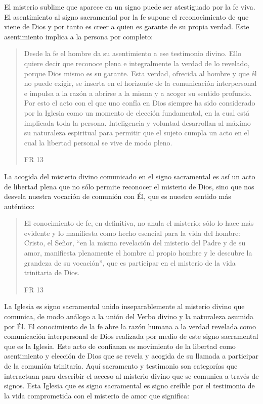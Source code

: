 El misterio sublime que aparece en un signo puede ser atestiguado por la fe
viva. El asentimiento al signo sacramental por la fe supone el reconocimiento de
que viene de Dios y por tanto es creer a quien es garante de su propia verdad.
Este asentimiento implica a la persona por completo:
\blockquote[FR 13]{Desde la fe el hombre da su asentimiento a ese testimonio
  divino. Ello quiere decir que reconoce plena e integralmente la verdad de lo
  revelado, porque Dios mismo es su garante. Esta verdad, ofrecida al hombre y
  que él no puede exigir, se inserta en el horizonte de la comunicación
  interpersonal e impulsa a la razón a abrirse a la misma y a acoger su sentido
  profundo. Por esto el acto con el que uno confía en Dios siempre ha sido
  considerado por la Iglesia como un momento de elección fundamental, en la cual
  está implicada toda la persona. Inteligencia y voluntad desarrollan al máximo
  su naturaleza espiritual para permitir que el sujeto cumpla un acto en el cual
  la libertad personal se vive de modo pleno.}
La acogida del misterio divino comunicado en el signo sacramental es así un acto
de libertad plena que no sólo permite reconocer el misterio de Dios, sino que
nos desvela nuestra vocación de comunión con Él, que es nuestro sentido más
auténtico:
\blockquote[FR 13]{El conocimiento de fe, en definitiva, no anula el misterio;
  sólo lo hace más evidente y lo manifiesta como hecho esencial para la vida del
  hombre: Cristo, el Señor, \enquote{en la misma revelación del misterio del
    Padre y de su amor, manifiesta plenamente el hombre al propio hombre y le
    descubre la grandeza de su vocación}, que es participar en el misterio de la
  vida trinitaria de Dios.}
La Iglesia es signo sacramental unido inseparablemente al misterio divino que
comunica, de modo análogo a la unión del Verbo divino y la naturaleza asumida
por Él. El conocimiento de la fe abre la razón humana a la verdad revelada como
comunicación interpersonal de Dios realizada por medio de este signo sacramental
que es la Iglesia. Este acto de confianza es movimiento de la libertad como
asentimiento y elección de Dios que se revela y acogida de su llamada a
participar de la comunión trinitaria. Aquí sacramento y testimonio son
categorías que interactuan para describir el acceso al misterio divino que se
comunica a través de signos. Esta Iglesia que es signo sacramental es signo
creíble por el testimonio de la vida comprometida con el misterio de amor que
significa:
